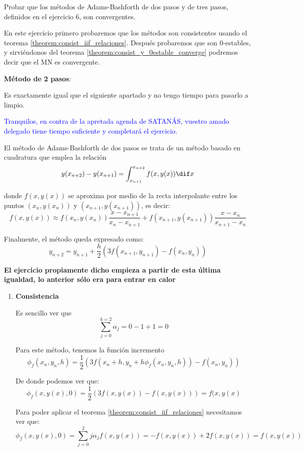 \begin{problem}[8]
Probar que los métodos de Adams-Bashforth de dos pasos y de tres pasos, definidos en el ejercicio 6, son convergentes.
\solution
{}

En este ejercicio primero probaremos que los métodos son consistentes usando el teorema \ref{theorem:consist_iif_relaciones}. Después probaremos que son 0-estables, y sirviéndonos del teorema \ref{theorem:consist_y_0estable_converge} podremos decir que el MN es convergente.

\spart \textbf{Método de 2 pasos}:

{\color{gray} Es exactamente igual que el siguiente apartado y no tengo tiempo para pasarlo a limpio.}

\textcolor{blue}{Tranquilos, en contra de la apretada agenda de SATANÁS, vuestro amado delegado tiene tiempo suficiente y completará el ejercicio.}

El método de Adams-Bashforth de dos pasos se trata de un método basado en cuadratura que emplea la relación
\[y(x_{n+2}) - y(x_{n+1}) = \int_{x_{n+1}}^{x_{n+2}} f(x,y(x)) \dif x\]

donde $f(x,y(x))$ se aproxima por medio de la recta interpolante entre los puntos $(x_n,y(x_n))$ y $(x_{n+1},y(x_{n+1}))$, es decir:
\[f(x,y(x)) \approx f(x_n, y(x_n)) \frac{x-x_{n+1}}{x_n-x_{n+1}}+f(x_{n+1},y(x_{n+1}))\frac{x-x_n}{x_{n+1}-x_n}\]

Finalmente, el método queda expresado como:
\[y_{n+2} = y_{n+1}+\frac{h}{2}\left( 3f(x_{n+1},y_{n+1})-f(x_n,y_n)\right)\]

\textbf{El ejercicio propiamente dicho empieza a partir de esta última igualdad, lo anterior sólo era para entrar en calor}

\begin{enumerate}
\item \textbf{Consistencia}

Es sencillo ver que \[\sum_{j=0}^{k=2} α_j = 0 - 1 + 1 = 0\]

Para este método, tenemos la función incremento
\[\phi_f(x_n,y_n,h) = \frac{1}{2}\left(3f(x_n+h,y_n+h\phi_f(x_n,y_n,h))-f(x_n,y_n)\right)\]

De donde podemos ver que:
\[\phi_f(x,y(x),0) = \frac{1}{2} \left(3f(x,y(x)) - f(x,y(x)) \right) = f(x,y(x)\]

Para poder aplicar el teorema \ref{theorem:consist_iif_relaciones} necesitamos ver que:
\[\phi_f(x,y(x),0)  = \sum_{j=0}^2jα_jf(x,y(x))=-f(x,y(x)) + 2 f(x,y(x)) = f(x,y(x))\]


\end{enumerate}
\end{problem}
